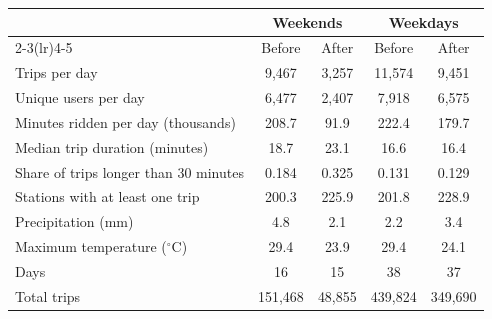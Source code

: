 \begin{tabular*}{\textwidth}{@{\extracolsep{\fill}}lcccc@{}}
\toprule
 & \multicolumn{2}{c}{Weekends} & \multicolumn{2}{c}{Weekdays} \\
\cmidrule(lr){2-3}\cmidrule(lr){4-5}
 & Before & After & Before & After \\
\midrule
Trips per day & 9,467 & 3,257 & 11,574 & 9,451 \\
Unique users per day & 6,477 & 2,407 & 7,918 & 6,575 \\
Minutes ridden per day (thousands) & 208.7 & 91.9 & 222.4 & 179.7 \\
Median trip duration (minutes) & 18.7 & 23.1 & 16.6 & 16.4 \\
Share of trips longer than 30 minutes & 0.184 & 0.325 & 0.131 & 0.129 \\
Stations with at least one trip & 200.3 & 225.9 & 201.8 & 228.9 \\
Precipitation (mm) & 4.8 & 2.1 & 2.2 & 3.4 \\
Maximum temperature (\(^{\circ}\)C) & 29.4 & 23.9 & 29.4 & 24.1 \\
\midrule
Days & 16 & 15 & 38 & 37 \\
Total trips & 151,468 & 48,855 & 439,824 & 349,690 \\
\bottomrule
\end{tabular*}

